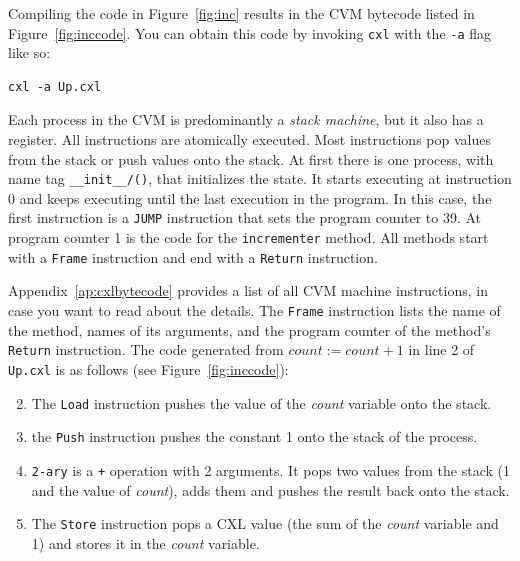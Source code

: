 \documentclass{report}
\newenvironment{code}{
\tcolorbox
}{
\endtcolorbox
}
\begin{document}
Compiling the code in Figure~\ref{fig:inc} results in the CVM bytecode
listed in Figure~\ref{fig:inccode}.
You can obtain this code by invoking \texttt{cxl} with the \texttt{-a} flag
like so:
\begin{code}
\begin{verbatim}
cxl -a Up.cxl
\end{verbatim}
\end{code}
Each process in the CVM is predominantly a \emph{stack machine},
but it also has a register.
All instructions are atomically executed.
Most instructions pop values from the stack or push values onto the stack.
At first there is one process, with name tag \texttt{\_\_init\_\_/()},
that initializes the state.
It starts executing at instruction 0 and keeps executing until the last
execution in the program.
In this case, the first instruction is a \texttt{JUMP} instruction that sets the
program counter to 39.
At program counter 1 is the code for the \texttt{incrementer} method.
All methods start with a \texttt{Frame} instruction and end with a \texttt{Return}
instruction.

Appendix~\ref{ap:cxlbytecode} provides a list of all CVM machine instructions,
in case you want to read about the details.
The \texttt{Frame} instruction lists the name of the method,
names of its arguments, and
the program counter of the method's \texttt{Return} instruction.
The code generated from $\mathit{count} := \mathit{count} + 1$ in line 2 of
\texttt{Up.cxl} is as follows (see Figure~\ref{fig:inccode}):

\begin{enumerate} \setcounter{enumi}{1}
\item The \texttt{Load} instruction pushes the value of the
\textit{count} variable onto the stack.
\item the \texttt{Push} instruction pushes the constant 1
onto the stack of the process.
\item \texttt{2-ary} is a \texttt{+} operation with 2 arguments.
It pops two values from the stack (1 and the value of \textit{count}),
adds them and pushes the result back onto the stack.
\item The \texttt{Store} instruction pops
a CXL value (the sum of the \textit{count} variable and 1) and
stores it in the \textit{count} variable.
\end{enumerate}
\end{document}
